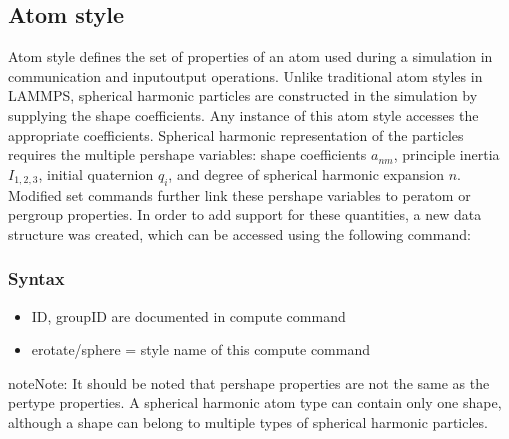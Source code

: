 \documentclass[letterpaper,10pt,english]{sphinxmanual}
\begin{document}
\subsection{Atom style}
\label{\detokenize{Sections/3_implementation:atom-style}}
\sphinxAtStartPar
Atom style defines the set of properties of an atom used during a simulation in communication and input\sphinxhyphen{}output operations. Unlike traditional atom styles in LAMMPS, spherical harmonic particles are constructed in the simulation by supplying the shape coefficients. Any instance of this atom style accesses the appropriate coefficients. Spherical harmonic representation of the particles requires the multiple per\sphinxhyphen{}shape variables: shape coefficients \(a_{nm}\), principle inertia \(I_{1,2,3}\), initial quaternion \(q_i\), and degree of spherical harmonic expansion \(n\). Modified set commands further link these per\sphinxhyphen{}shape variables to per\sphinxhyphen{}atom or per\sphinxhyphen{}group properties. In order to add support for these quantities, a new data structure was created, which can be accessed using the following command:


\subsubsection{Syntax}
\label{\detokenize{Sections/3_implementation:syntax}}
\begin{sphinxVerbatim}[commandchars=\\\{\}]
    
\end{sphinxVerbatim}
\begin{itemize}
\item {} 
\sphinxAtStartPar
ID, group\sphinxhyphen{}ID are documented in compute command

\item {} 
\sphinxAtStartPar
erotate/sphere = style name of this compute command

\end{itemize}

\begin{sphinxadmonition}{note}{Note:}
\sphinxAtStartPar
It should be noted that  per\sphinxhyphen{}shape properties are not the same as the per\sphinxhyphen{}type properties. A spherical harmonic atom type can contain only one shape, although a shape can belong to multiple types of spherical harmonic particles.
\end{sphinxadmonition}
\end{document}
